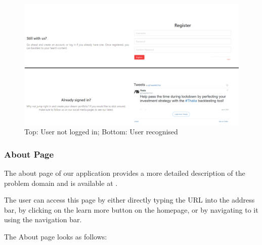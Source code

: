 \documentclass[main.tex]{subfiles}
\begin{document}
\begin{figure}[H]
   \centering
   \includegraphics[width=\textwidth]{08Appendices/081User/081Pictures/homepage_bottom.png}
   \caption{Top: User not logged in; Bottom: User recognised}
   \label{thalia_home_bottom}
\end{figure}

\subsubsection{About Page}
The about page of our application provides a more detailed description of the problem domain and is available at .

The user can access this page by either directly typing the URL into the address bar, by clicking on the learn more button on the homepage, or by navigating to it using the navigation bar.

The About page looks as follows:
\end{document}
